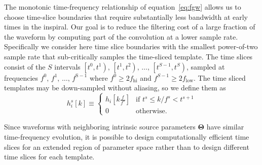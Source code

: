 The monotonic time-frequency relationship of equation~\eqref{eq:fgw} allows us
to choose time-slice boundaries that require substantially less bandwidth at
early times in the inspiral.  Our goal is to reduce the filtering cost of a
large fraction of the waveform by computing part of the convolution at a lower
sample rate.  Specifically we consider here time slice boundaries with the
smallest power-of-two sample rate that sub-critically samples the time-sliced
template.  The time slices consist of the $S$ intervals
$\left[t^0, t^1\right),\, \left[t^1, t^2\right),\, \dots,\, \left[t^{S-1}, t^S\right)$,
sampled at frequencies $f^0,\, f^1,\, \dots,\, f^\mathrm{S-1}$ where $f^0
\geqslant 2 f_\mathrm{hi}$ and $f^{S-1} \geqslant 2 f_\mathrm{low}$.  The time
sliced templates may be down-sampled without aliasing, so we define them as
%
\begin{equation}
\label{eq:time-sliced-templates}
h_{i}^{s}[k] \equiv
	\begin{cases}
		h_{i}\!\left[k\frac{f}{f^s}\right] & \textrm{if } t^s \leqslant k/f^s < t^{s+1} \\
		0 & \textrm{otherwise.}
	\end{cases}
\end{equation}
%

Since waveforms with neighboring intrinsic source parameters $\mathbf\Theta$ have
similar time-frequency evolution, it is possible to design computationally
efficient time slices for an extended region of parameter space rather than to
design different time slices for each template.

